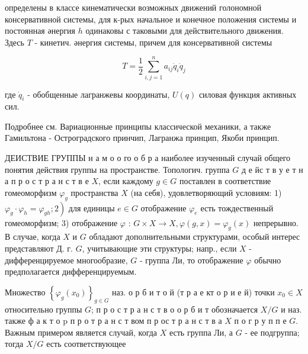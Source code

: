 \documentclass[10pt]{article}
\begin{document}
определены в классе кинематически возможных движений голономной консервативной системы, для к-рых начальное и конечное положения системы и постоянная әнергия $h$ одинаковы с таковыми для действительного движения. Здесь $T$ - кинетич. әнергия системы, причем для консервативной системы



\[

T=\frac{1}{2} \sum_{i, j=1}^{n} a_{i j} \dot{q}_{i} \dot{q}_{j}

\]



где $\dot{q}_{i}$ - обобщенные лагранжевы координаты, $U(q)$ силовая функция активных сил.



Подробнее см. Вариационные принципы классической механики, а также Гамильтона - Остроградского принчип, Лагранжа принцип, Якоби принцип.



ДЕИСТВИЕ ГРУППЫ н а м о о го о б р а наиболее изученный случай общего понятия действия группы на пространстве. Топологич. группа $G$ д е йс т в у е т н а п р о с т р а н с т в е $X$, если каждому $g \in G$ поставлен в соответствие гомеоморфизм $\varphi_{g}$ пространства $X$ (на себя), удовлетворяющий условиям: 1) $\left.\varphi_{g} \cdot \varphi_{h}=\varphi_{g h} ; 2\right)$ для единицы $e \in G$ отображение $\varphi_{e}$ есть тождественный гомеоморфизм; 3) отображение $\varphi$ : $G \times X \rightarrow X, \varphi(g, x)=\varphi_{g}(x)$ непрерывно. В случае, когда $X$ и $G$ обладают дополнительными структурами, особый интерес представляют Д. г. $G$, учитывающие эти структуры; напр., если $X$ - дифференцируемое многообразие, $G$ - группа Ли, то отображение $\varphi$ обычно предполагается дифференцируемым.



Множество $\left\{\varphi_{g}\left(x_{0}\right)\right\}_{g \in G}$ наз. о р б и т о й (т р а е кт о р и е й) точки $x_{0} \in X$ относительно группы $G$; п р о с т р а н с т в о о р б и т обозначается $X / G$ и наз. также ф а к т о $\mathrm{p}$ п р о т р а н с т вом п р ос т р а н с т в а $X$ п о г р у п п е $G$. Важным примером является случай, когда $X$ есть группа Ли, а $G$ - ее подгруппа; тогда $X / G$ есть соответствующее
\end{document}
